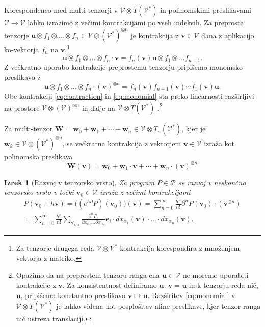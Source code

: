 \documentclass[a4paper, 12pt]{book}
\newcommand{\bfW}{\mathbf{W}}
\newcommand{\bfw}{\mathbf{w}}
\newcommand{\VV}{\mathcal{V}}
\newcommand{\e}{\mathbf{e}}
\newcommand{\uu}{\mathbf{u}}
\newcommand{\vv}{\mathbf{v}}
\newcommand{\dP}{\mathcal{P}}
\newcommand{\D}{\partial}
\newtheorem{izrek}{Izrek}[chapter]
\begin{document}
Korespondenco med multi-tenzorji v $\VV\otimes T(\VV^ *)$ in polinomskimi preslikavami $\VV\to\VV$ lahko izrazimo z večimi kontrakcijami po vseh indeksih. Za preproste tenzorje  $\uu\otimes
 f_1\otimes\ldots\otimes f_n\in \VV\otimes(\VV^*)^{\otimes n}$ je kontrakcija z $\vv\in\VV$ dana z aplikacijo ko-vektorja $f_n$ na $\vv$,\footnote{Za tenzorje drugega reda $\VV\otimes\VV^*$ kontrakcija korespondira z množenjem vektorja z matriko.}
\begin{equation}
   \label{eq:contraction}
 \uu\otimes f_1\otimes\ldots\otimes f_n\cdot \vv = f_n(\vv) \uu\otimes f_1\otimes\ldots f_{n-1}.
\end{equation}
Z večkratno uporabo kontrakcije preprostemu tenzorju pripišemo monomsko preslikavo z
 \begin{equation}
   \label{eq:monomial}
 \uu\otimes f_1\otimes\ldots\otimes f_n\cdot (\vv)^{\otimes n} = f_n(\vv)f_{n-1}(\vv)\cdots f_1(\vv) \uu.
\end{equation}
Obe kontrakciji \eqref{eq:contraction} in \eqref{eq:monomial} sta preko linearnosti razširljivi na prostore $\VV\otimes(\VV)^{\otimes n}$ in dalje na $\VV\otimes T(\VV^ *)$ .\footnote{Opazimo da na preprostem tenzoru ranga ena
  $\uu\in\VV$ ne moremo uporabiti kontrakcije z $\vv$. Za konsistentnost definiramo $\uu\cdot \vv = \uu$ in k tenzorju reda nič, $\uu$, pripišemo konstantno preslikavo
  $\vv\mapsto \uu$. Razširitev
  \eqref{eq:monomial}
  v $\VV\otimes T(\VV^*)$ je lahko videna kot posplošitev afine preslikave,
  kjer tenzor ranga nič ustreza translaciji.}
  
  \noindent Za multi-tenzor $\bfW=\bfw_0+\bfw_1+\cdots+\bfw_n\in\VV\otimes T_n(\VV^*)$, kjer je $\bfw_k\in\VV\otimes(\VV^*)^{\otimes n}$, se večkratna kontrakcija z vektorjem $\vv\in\VV$ izraža kot polinomska preslikava
  \begin{equation}
  \label{eq:polynomial_tensor}
  \bfW(\vv)=\bfw_0+\bfw_1\cdot\vv+\cdots+\bfw_n\cdot(\vv)^{\otimes n}
  \end{equation}

\begin{izrek}[Razvoj v tenzorsko vrsto]\label{izr:e^d}
	Za program $P\in\dP$  se razvoj v neskončno tenzorsko vrsto
  v točki $\vv_0\in \VV$ izraža z večimi kontrakcijami 
	\begin{multline}\label{eq:tenzorVrsta}
	P(\vv_0+h\vv) = \Big((e^{h\D}P)(\vv_0)\Big)(\vv)
  = \sum_{n=0}^\infty\frac{h^n}{n!}\D^nP(\vv_0)\cdot (\vv^{\otimes n})\\
  = \sum_{n=0}^\infty \frac{h^n}{n!}\sum_{\forall_{i,\alpha}}\frac{\partial^nP_i}{\partial
 		    x_{\alpha_1}\ldots \partial x_{\alpha_n}}\e_i\cdot
 		  dx_{\alpha_1}(\vv)\cdot\ldots \cdot dx_{\alpha_n}(\vv).
	\end{multline}
\end{izrek}
 
\end{document}
